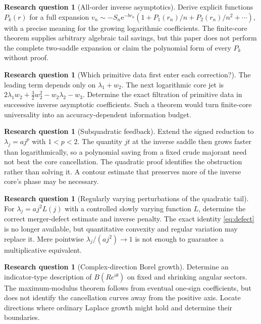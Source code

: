 \documentclass[11pt,a4paper]{article}
\numberwithin{equation}{section}
\theoremstyle{definition}
\newtheorem{question}[theorem]{Research question}
\theoremstyle{remark}\newtheorem{remark}[theorem]{Remark}
\newcommand{\ee}{\mathrm e}\newcommand{\dd}{\mathrm d}
\begin{document}
\begin{question}[All-order inverse asymptotics]
Derive explicit functions $P_k(r)$ for a full expansion
$v_n\sim-S_n\ee^{-br_n}(1+P_1(r_n)/n+P_2(r_n)/n^2+\cdots)$,
with a precise meaning for the growing logarithmic coefficients.
The finite-core theorem supplies arbitrary algebraic tail savings, but this
paper does not perform the complete two-saddle expansion or claim the
polynomial form of every $P_k$ without proof.
\end{question}

\begin{question}[Which primitive data first enter each correction?]
The leading term depends only on $\lambda_1+w_2$. The next logarithmic core
jet is $2\lambda_1w_2+\tfrac32w_2^2-w_2\lambda_2-w_3$.
Determine the exact filtration of primitive data in successive inverse
asymptotic coefficients. Such a theorem would turn finite-core universality
into an accuracy-dependent information budget.
\end{question}

\begin{question}[Subquadratic feedback]
Extend the signed reduction to $\lambda_j=aj^p$ with $1<p<2$.
The quantity $jt$ at the inverse saddle then grows faster than logarithmically,
so a polynomial saving from a fixed crude majorant need not beat the core
cancellation. The quadratic proof identifies the obstruction rather than
solving it. A contour estimate that preserves more of the inverse core's
phase may be necessary.
\end{question}

\begin{question}[Regularly varying perturbations of the quadratic tail]
For $\lambda_j=aj^2L(j)$ with a controlled slowly varying function $L$,
determine the correct merger-defect estimate and inverse penalty.
The exact identity \eqref{eq:defect} is no longer available, but quantitative
convexity and regular variation may replace it. Mere pointwise
$\lambda_j/(aj^2)\to1$ is not enough to guarantee a multiplicative equivalent.
\end{question}

\begin{question}[Complex-direction Borel growth]
Determine an indicator-type description of $B(Re^{i\theta})$ on fixed and
shrinking angular sectors. The maximum-modulus theorem follows from eventual
one-sign coefficients, but does not identify the cancellation curves away
from the positive axis. Locate directions where ordinary Laplace growth
might hold and determine their boundaries.
\end{question}
\end{document}
